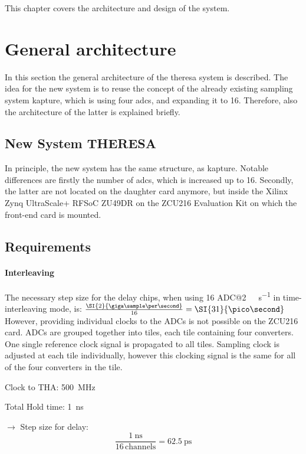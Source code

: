 This chapter covers the architecture and design of the system.
\section{General architecture}
In this section the general architecture of the \gls{theresa} system is described.
The idea for the new system is to reuse the concept of the already existing sampling system \gls{kapture}, which is using four \glspl{adc}, and expanding it to 16. Therefore, also the architecture of the latter is explained briefly.

\newpage
\subsection{New System THERESA}
In principle, the new system has the same structure, as \gls{kapture}. Notable differences are firstly the number of \glspl{adc}, which is increased up to 16. Secondly, the latter are not located on the daughter card anymore, but inside the Xilinx Zynq UltraScale+ RFSoC ZU49DR on the ZCU216 Evaluation Kit on which the front-end card is mounted.





\subsection{Requirements}
\paragraph{Interleaving}
The necessary step size for the delay chips, when using 16 ADC@\SI{2}{\giga \sample \per \second} in time-interleaving mode, is: $\frac{\SI{2}{\giga \sample \per \second}}{16} = \SI{31}{\pico \second}$
However, providing individual clocks to the ADCs is not possible on the ZCU216 card. ADCs are grouped together into tiles, each tile containing four converters. One single reference clock signal is propagated to all tiles. Sampling clock is adjusted at each tile individually, however this clocking signal is the same for all of the four converters in the tile.

Clock to THA: \SI{500}{\mega \hertz}

Total Hold time: \SI{1}{\nano \second}

$\rightarrow$ Step size for delay:
\begin{equation}
	\frac{\SI{1}{\nano \second}}{16 \, \text{channels}} = \SI{62.5}{\pico \second}
\end{equation}


